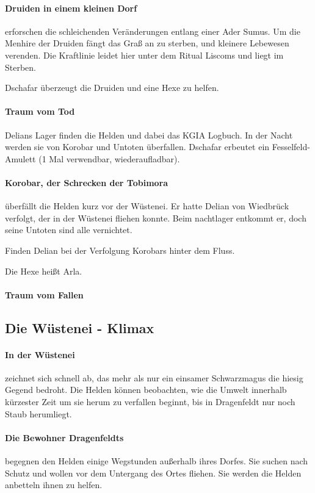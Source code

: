 \paragraph{Druiden in einem kleinen Dorf} erforschen die schleichenden Veränderungen entlang einer Ader Sumus. Um die Menhire der Druiden fängt das Graß an zu sterben, und kleinere Lebewesen verenden. Die Kraftlinie leidet hier unter dem Ritual Liscoms und liegt im Sterben.

Dschafar überzeugt die Druiden und eine Hexe zu helfen.

\paragraph{Traum vom Tod}

Delians Lager finden die Helden und dabei das KGIA Logbuch. In der Nacht werden sie von Korobar und Untoten überfallen. Dschafar erbeutet ein Fesselfeld-Amulett (1 Mal verwendbar, wiederaufladbar).

\paragraph{Korobar, der Schrecken der Tobimora} überfällt die Helden kurz vor der Wüstenei. Er hatte Delian von Wiedbrück verfolgt, der in der Wüstenei fliehen konnte. Beim nachtlager entkommt er, doch seine Untoten sind alle vernichtet.

Finden Delian bei der Verfolgung Korobars hinter dem Fluss.

Die Hexe heißt Arla.

\paragraph{Traum vom Fallen}

\subsection{Die Wüstenei - Klimax}

\paragraph{In der Wüstenei} zeichnet sich schnell ab, das mehr als nur ein einsamer Schwarzmagus die hiesig Gegend bedroht. Die Helden können beobachten, wie die Umwelt innerhalb kürzester Zeit um sie herum zu verfallen beginnt, bis in Dragenfeldt nur noch Staub herumliegt.

\paragraph{Die Bewohner Dragenfeldts} begegnen den Helden einige Wegstunden außerhalb ihres Dorfes. Sie suchen nach Schutz und wollen vor dem Untergang des Ortes fliehen. Sie werden die Helden anbetteln ihnen zu helfen.

